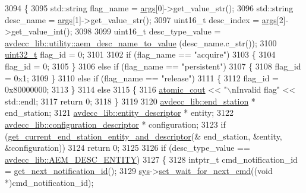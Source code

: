 \begin{DoxyCode}
3094 \{
3095     std::string flag\_name = \hyperlink{namespaceastime__fitline_a8187411843a6284ffb964ef3fb9fcab3}{args}[0]->get\_value\_str();
3096     std::string desc\_name = \hyperlink{namespaceastime__fitline_a8187411843a6284ffb964ef3fb9fcab3}{args}[1]->get\_value\_str();
3097     uint16\_t desc\_index = \hyperlink{namespaceastime__fitline_a8187411843a6284ffb964ef3fb9fcab3}{args}[2]->get\_value\_int();
3098 
3099     uint16\_t desc\_type\_value = \hyperlink{namespaceavdecc__lib_1_1utility_a9f6076e32fa227555a95b6e95ea1e29b}{avdecc\_lib::utility::aem\_desc\_name\_to\_value}
      (desc\_name.c\_str());
3100     \hyperlink{parse_8c_a6eb1e68cc391dd753bc8ce896dbb8315}{uint32\_t} flag\_id = 0;
3101 
3102     \textcolor{keywordflow}{if} (flag\_name == \textcolor{stringliteral}{"acquire"})
3103     \{
3104         flag\_id = 0;
3105     \}
3106     \textcolor{keywordflow}{else} \textcolor{keywordflow}{if} (flag\_name == \textcolor{stringliteral}{"persistent"})
3107     \{
3108         flag\_id = 0x1;
3109     \}
3110     \textcolor{keywordflow}{else} \textcolor{keywordflow}{if} (flag\_name == \textcolor{stringliteral}{"release"})
3111     \{
3112         flag\_id = 0x80000000;
3113     \}
3114     \textcolor{keywordflow}{else}
3115     \{
3116         \hyperlink{cmd__line_8h_a0bc38ccc65c79ba06c6fcd7b4bf554c3}{atomic\_cout} << \textcolor{stringliteral}{"\(\backslash\)nInvalid flag"} << std::endl;
3117         \textcolor{keywordflow}{return} 0;
3118     \}
3119 
3120     \hyperlink{classavdecc__lib_1_1end__station}{avdecc\_lib::end\_station} * end\_station;
3121     \hyperlink{classavdecc__lib_1_1entity__descriptor}{avdecc\_lib::entity\_descriptor} * entity;
3122     \hyperlink{classavdecc__lib_1_1configuration__descriptor}{avdecc\_lib::configuration\_descriptor} * configuration;
3123     \textcolor{keywordflow}{if} (\hyperlink{classcmd__line_ac2d4611fba7db03d436a2e3c1e64828e}{get\_current\_end\_station\_entity\_and\_descriptor}(&
      end\_station, &entity, &configuration))
3124         \textcolor{keywordflow}{return} 0;
3125 
3126     \textcolor{keywordflow}{if} (desc\_type\_value == \hyperlink{namespaceavdecc__lib_ac7b7d227e46bc72b63ee9e9aae15902fac9ebb31a55e5894637f6c3c710ceceaf}{avdecc\_lib::AEM\_DESC\_ENTITY})
3127     \{
3128         intptr\_t cmd\_notification\_id = \hyperlink{classcmd__line_a57486218387d1aa9d262eb7c176154ad}{get\_next\_notification\_id}();
3129         \hyperlink{classcmd__line_a485db4800e331cb4052c447fdf5d154e}{sys}->\hyperlink{classavdecc__lib_1_1system_a26b769584f10225077da47583edda33e}{set\_wait\_for\_next\_cmd}((\textcolor{keywordtype}{void} *)cmd\_notification\_id);

\end{DoxyCode}
